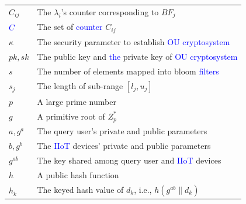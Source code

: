 \documentclass[IEEE JOURNAL OF BIOMEDICAL AND HEALTH INFORMATICS]{IEEEtran}
\begin{document}
{\begin{table}[h]
\begin{tabular}{ll}
		$C_{ij}$           &  The $\lambda_i$'s counter corresponding to $BF_j$\\
		$\textcolor{blue}{C}$                & The set of \textcolor{blue}{counter} $C_{ij}$\\
		$\kappa$           & The security parameter to establish \textcolor{blue}{OU cryptosystem}\\
		$pk, sk$           & The public key and \textcolor{blue}{the} private key of \textcolor{blue}{OU cryptosystem}\\
		$s$                & The number of elements mapped into bloom \textcolor{blue}{filters}\\
		$s_j$              & The length of sub-range $[l_j, u_j]$ \\
		$p$ 			   & A large prime number\\
		$g$ 			   & A primitive root of $Z^{*}_p$\\
		$a, g^a$ 		   & The query user's private and public parameters\\
		$b, g^b$ 		   & The \textcolor{blue}{IIoT} devices' private and public parameters\\
		$g^{ab}$           & The key shared among query user and \textcolor{blue}{IIoT} devices\\
		$h$                & A public hash function\\
		$h_k$              & The keyed hash value of $d_k$, i.e., $h(g^{ab} \| d_k)$\\
		\hline
	\end{tabular}
\end{table}


}
\end{document}
